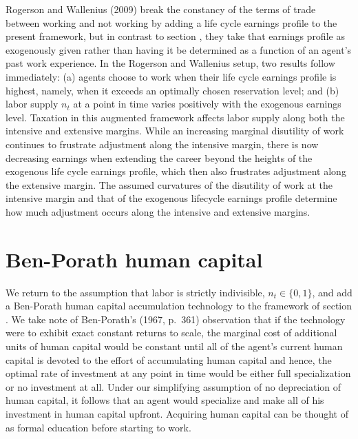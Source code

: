Rogerson and Wallenius (2009) break the constancy of the terms
of trade between working and not working by adding a life cycle
earnings profile to the present framework, but in contrast to section
, they  take that earnings profile as exogenously given
rather than having it be determined as a function of an agent's past work experience. In the
Rogerson and Wallenius setup, two results
follow immediately: (a) agents choose to work when their life cycle
earnings profile is highest, namely, when it  exceeds an
optimally chosen reservation level; and (b)
labor supply $n_t$ at a point in time varies positively with the
exogenous earnings level. Taxation in this augmented
framework affects labor supply along both the intensive and extensive
margins. While an increasing marginal disutility of work continues
to frustrate adjustment along the intensive margin, there is now
decreasing earnings when extending the career beyond the heights of the exogenous life cycle earnings profile, which
then also frustrates adjustment along the extensive margin. The
assumed curvatures of the disutility of work at the intensive
margin and that of the exogenous lifecycle earnings
profile determine how much  adjustment occurs
along the intensive and extensive margins.
%
%


\section{Ben-Porath human capital}\label{sec:LSbenporath}%
We return to the assumption that labor is strictly indivisible,
$n_t\in \{0,1\}$, and add a Ben-Porath human capital accumulation
technology to the framework of section . We take
note of Ben-Porath's (1967, p.~361) observation that if the
technology were to exhibit exact constant returns to scale, the
marginal cost of additional units of human capital would be
constant until all of the agent's current human capital
is devoted to the effort of accumulating human capital and hence,
the optimal rate of investment at any point in time would be
either full specialization or no investment at all. Under our
simplifying assumption of no depreciation of human capital,
it follows that an agent would specialize and make all of
his investment in human capital upfront. Acquiring human capital  can be
thought of as formal education before starting to work.
%

